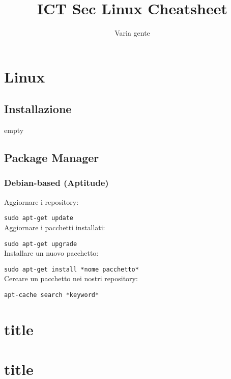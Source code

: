 \documentclass[]{report}
\title{ICT Sec Linux Cheatsheet}
\author{Varia gente}
\begin{document}
\maketitle

\chapter{Linux}
\section{Installazione}
empty
\section{Package Manager}
\subsection{Debian-based (Aptitude)}
\noindent Aggiornare i repository:

\verb|sudo apt-get update|\\

\noindent Aggiornare i pacchetti installati:

\verb|sudo apt-get upgrade|\\

\noindent Installare un nuovo pacchetto:

\verb|sudo apt-get install *nome pacchetto*|\\

\noindent Cercare un pacchetto nei nostri repository:

\verb|apt-cache search *keyword*|\\








\chapter{title}
\chapter{title}
\end{document}
